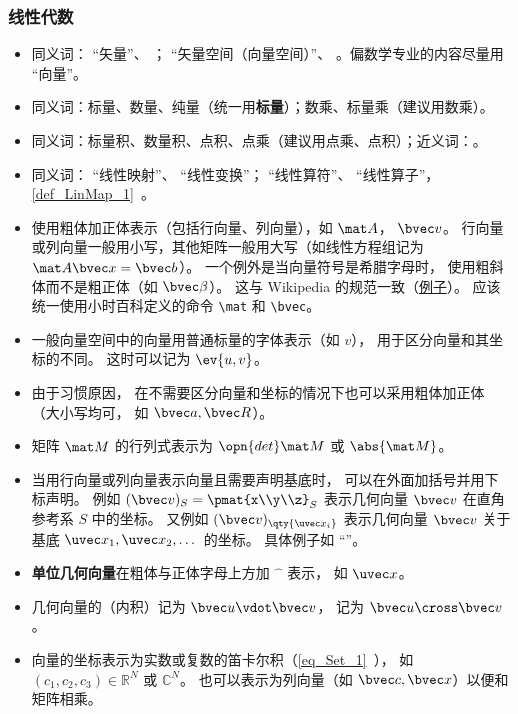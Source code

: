 \subsubsection{线性代数}
\begin{itemize}
\item 同义词： “矢量”、 ； “矢量空间（向量空间）”、 。偏数学专业的内容尽量用 “向量”。
\item 同义词：标量、数量、纯量（统一用\textbf{标量}）；数乘、标量乘（建议用数乘）。
\item 同义词：标量积、数量积、点积、点乘（建议用点乘、点积）；近义词：。
\item 同义词： “线性映射”、 “线性变换”； “线性算符”、 “线性算子”，\autoref{def_LinMap_1}~。
\item 使用粗体加正体表示（包括行向量、列向量），如 $\mat A$， $\bvec v$。 行向量或列向量一般用小写，其他矩阵一般用大写（如线性方程组记为 $\mat A \bvec x = \bvec b$）。 一个例外是当向量符号是希腊字母时， 使用粗斜体而不是粗正体（如 $\bvec \beta$）。 这与 Wikipedia 的规范一致（\href{https://en.wikipedia.org/wiki/Angular_acceleration}{例子}）。 应该统一使用小时百科定义的命令 \verb|\mat| 和 \verb|\bvec|。
\item 一般向量空间中的向量用普通标量的字体表示（如 $v$）， 用于区分向量和其坐标的不同。 这时可以记为 $\ev{u, v}$。
\item 由于习惯原因， 在不需要区分向量和坐标的情况下也可以采用粗体加正体（大小写均可， 如 $\bvec a, \bvec R$）。
\item 矩阵 $\mat M$ 的行列式表示为 $\opn{det}\mat M$ 或 $\abs{\mat M}$。
\item 当用行向量或列向量表示向量且需要声明基底时， 可以在外面加括号并用下标声明。 例如 $(\bvec v)_S = \pmat{x\\y\\z}_S$ 表示几何向量 $\bvec v$ 在直角参考系 $S$ 中的坐标。 又例如 $(\bvec v)_{\qty{\uvec x_i}}$ 表示几何向量 $\bvec v$ 关于基底 $\uvec x_1, \uvec x_2, \dots$ 的坐标。 具体例子如 “”。
\item \textbf{单位几何向量}在粗体与正体字母上方加 $\hat{\phantom{x}}$ 表示， 如 $\uvec x$。
\item 几何向量的（内积）记为 $\bvec u \vdot \bvec v$， 记为 $\bvec u \cross \bvec v$。
\item 向量的坐标表示为实数或复数的笛卡尔积（\autoref{eq_Set_1}~）， 如 $(c_1, c_2, c_3) \in  \mathbb R^N$ 或 $\mathbb C^N$。 也可以表示为列向量（如 $\bvec c, \bvec x$）以便和矩阵相乘。

\end{itemize}
